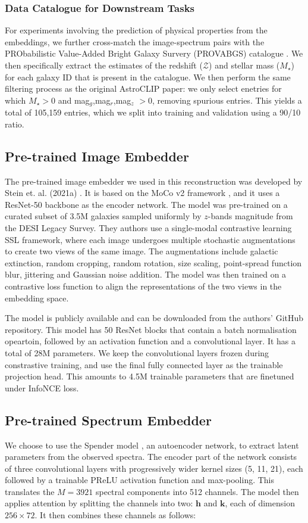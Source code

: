 \documentclass[a4paper,12pt]{article}
\begin{document}
\subsubsection*{Data Catalogue for Downstream Tasks}
For experiments involving the prediction of physical properties from the embeddings, we further cross-match the image-spectrum pairs with the PRObabilistic Value-Added Bright Galaxy Survery (PROVABGS) catalogue \cite{PROVABGS}. We then specifically extract the estimates of the redshift ($\mathcal{Z}$) and stellar mass ($M_{\star}$) for each galaxy ID that is present in the catalogue. We then perform the same filtering process as the original AstroCLIP paper: we only select enetries for which $M_{\star} > 0$ and mag$_g$,mag$_r$,mag$_z$ $> 0$, removing spurious entries. This yields a total of 105,159 entries, which we split into training and validation using a 90/10 ratio.



\subsection{Pre-trained Image Embedder} 
The pre-trained image embedder we used in this reconstruction was developed by Stein et. al. (2021a) \cite{stein}. It is based on the MoCo v2 framework \cite{mocov2}, and it uses a ResNet-50 backbone as the encoder network. The model was pre-trained on a curated subset of 3.5M galaxies sampled uniformly by $z$-bands magnitude from the DESI Legacy Survey. They authors use a single-modal contrastive learning SSL framework, where each image undergoes multiple stochastic augmentations to create two views of the same image. The augmentations include galactic extinction, random cropping, random rotation, size scaling, point-spread function blur, jittering and Gaussian noise addition. The model was then trained on a contrastive loss function to align the representations of the two views in the embedding space. 

The model is publicly available and can be downloaded from the authors' GitHub repository. This model has 50 ResNet blocks that contain a batch normalisation opeartoin, followed by an activation function and a convolutional layer. It has a total of 28M parameters. We keep the convolutional layers frozen during constrastive training, and use the final fully connected layer as the trainable projection head. This amounts to 4.5M trainable parameters that are finetuned under InfoNCE loss. 


\subsection{Pre-trained Spectrum Embedder}
We choose to use the Spender model \cite{spender}, an autoencoder network, to extract latent parameters from the observed spectra. The encoder part of the network consists of three convolutional layers with progressively wider kernel sizes (5, 11, 21), each followed by a trainable PReLU activation function and max-pooling. This translates the $M=3921$ spectral components into 512 channels. The model then applies attention by splitting the channels into two: $\mathbf{h}$ and $\mathbf{k}$, each of 
dimension $256 \times 72$. It then combines these channels as follows:
\end{document}
